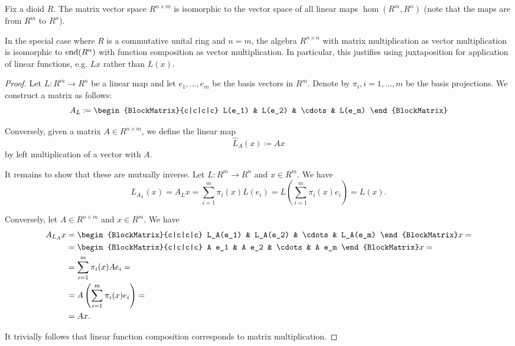 \begin{proposition}\label{thm:finite_dimensional_operators_are_isomorphic_to_matrices}
  Fix a dioid \( R \). The matrix vector space \( R^{n \times m} \) is isomorphic to the vector space of all linear maps \( \hom(R^m, R^n) \) (note that the maps are from \( R^m \) to \( R^n \)).

  In the special case where \( R \) is a commutative unital ring and \( n = m \), the algebra \( R^{n \times n} \) with matrix multiplication as vector multiplication is isomorphic to \( \operatorname{end}(R^n) \) with function composition as vector multiplication. In particular, this justifies using juxtaposition for application of linear functions, e.g. \( Lx \) rather than \( L(x) \).
\end{proposition}
\begin{proof}
  Let \( L: R^m \to R^n \) be a linear map and let \( e_1, \ldots, e_m \) be the basis vectors in \( R^m \). Denote by \( \pi_i, i = 1, \ldots, m \) be the basis projections. We construct a matrix as follows:
  \begin{equation*}
    A_L \coloneqq \begin{BlockMatrix}{c|c|c|c}
      L(e_1) & L(e_2) & \cdots & L(e_m)
    \end{BlockMatrix}
  \end{equation*}

  Conversely, given a matrix \( A \in R^{n \times m} \), we define the linear map
  \begin{equation*}
    \hat L_A(x) \coloneqq Ax
  \end{equation*}
  by left multiplication of a vector with \( A \).

  It remains to show that these are mutually inverse. Let \( L: R^m \to R^n \) and \( x \in R^m \). We have
  \begin{equation*}
    L_{A_L}(x) = A_L x = \sum_{i=1}^m \pi_i(x) L(e_i) = L\left(\sum_{i=1}^m \pi_i(x) e_i \right) = L(x).
  \end{equation*}

  Conversely, let \( A \in R^{n \times m} \) and \( x \in R^m \). We have
  \begin{align*}
    A_{L_A} x
    &=
    \begin{BlockMatrix}{c|c|c|c}
      L_A(e_1) & L_A(e_2) & \cdots & L_A(e_m)
    \end{BlockMatrix}
    x
    = \\ &=
    \begin{BlockMatrix}{c|c|c|c}
      A e_1 & A e_2 & \cdots & A e_m
    \end{BlockMatrix}
    x
    = \\ &=
    \sum_{i=1}^m \pi_i(x) A e_i
    = \\ &=
    A \left( \sum_{i=1}^m \pi_i(x) e_i \right)
    = \\ &=
    Ax.
  \end{align*}

  It trivially follows that linear function composition corresponds to matrix multiplication.
\end{proof}

